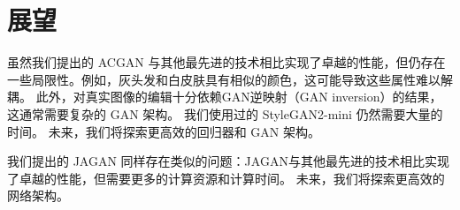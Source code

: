 \section{展望}

虽然我们提出的 ACGAN 与其他最先进的技术相比实现了卓越的性能，但仍存在一些局限性。例如，灰头发和白皮肤具有相似的颜色，这可能导致这些属性难以解耦。 此外，对真实图像的编辑十分依赖GAN逆映射（GAN inversion）的结果，这通常需要复杂的 GAN 架构。 我们使用过的 StyleGAN2-mini 仍然需要大量的时间。 未来，我们将探索更高效的回归器和 GAN 架构。

我们提出的 JAGAN 同样存在类似的问题：JAGAN与其他最先进的技术相比实现了卓越的性能，但需要更多的计算资源和计算时间。 未来，我们将探索更高效的网络架构。